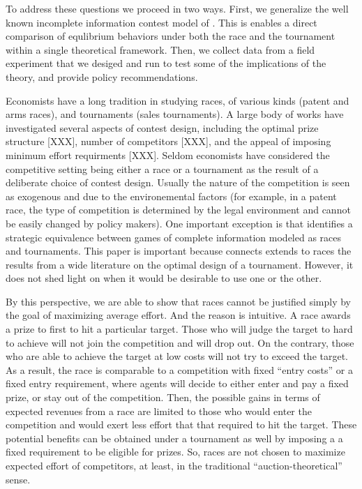 \documentclass[12pt,]{article}
\begin{document}
To address these questions we proceed in two ways. First, we generalize
the well known incomplete information contest model of
\citet{moldovanu2001optimal}. This is enables a direct comparison of
equlibrium behaviors under both the race and the tournament within a
single theoretical framework. Then, we collect data from a field
experiment that we desiged and run to test some of the implications of
the theory, and provide policy recommendations.

Economists have a long tradition in studying races, of various kinds
(patent and arms races), and tournaments (sales tournaments). A large
body of works have investigated several aspects of contest design,
including the optimal prize structure {[}XXX{]}, number of competitors
{[}XXX{]}, and the appeal of imposing minimum effort requirments
{[}XXX{]}. Seldom economists have considered the competitive setting
being either a race or a tournament as the result of a deliberate choice
of contest design. Usually the nature of the competition is seen as
exogenous and due to the environemental factors (for example, in a
patent race, the type of competition is determined by the legal
environment and cannot be easily changed by policy makers). One
important exception is \citet{baye2003strategic} that identifies a
strategic equivalence between games of complete information modeled as
races and tournaments. This paper is important because connects extends
to races the results from a wide literature on the optimal design of a
tournament. However, it does not shed light on when it would be
desirable to use one or the other.

By this perspective, we are able to show that races cannot be justified
simply by the goal of maximizing average effort. And the reason is
intuitive. A race awards a prize to first to hit a particular target.
Those who will judge the target to hard to achieve will not join the
competition and will drop out. On the contrary, those who are able to
achieve the target at low costs will not try to exceed the target. As a
result, the race is comparable to a competition with fixed ``entry
costs'' or a fixed entry requirement, where agents will decide to either
enter and pay a fixed prize, or stay out of the competition. Then, the
possible gains in terms of expected revenues from a race are limited to
those who would enter the competition and would exert less effort that
that required to hit the target. These potential benefits can be
obtained under a tournament as well by imposing a a fixed requirement to
be eligible for prizes. So, races are not chosen to maximize expected
effort of competitors, at least, in the traditional
``auction-theoretical'' sense.
\end{document}
